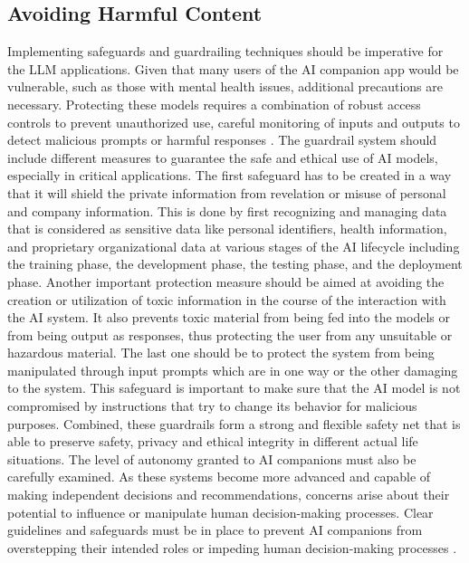 \subsection{Avoiding Harmful Content}
Implementing safeguards and guardrailing techniques \cite{biswas2023guardrails} should be imperative for the LLM applications. Given that many users of the AI companion app would be vulnerable, such as those with mental health issues, additional precautions are necessary. Protecting these models requires a combination of robust access controls to prevent unauthorized use, careful monitoring of inputs and outputs to detect malicious prompts or harmful responses \cite{ayyamperumal2024current}. The guardrail system should include different measures to guarantee the safe and ethical use of AI models, especially in critical applications. The first safeguard has to be created in a way that it will shield the private information from revelation or misuse of personal and company information. This is done by first recognizing and managing data that is considered as sensitive data like personal identifiers, health information, and proprietary organizational data at various stages of the AI lifecycle including the training phase, the development phase, the testing phase, and the deployment phase. Another important protection measure should be aimed at avoiding the creation or utilization of toxic information in the course of the interaction with the AI system. It also prevents toxic material from being fed into the models or from being output as responses, thus protecting the user from any unsuitable or hazardous material. The last one should be to protect the system from being manipulated through input prompts which are in one way or the other damaging to the system. This safeguard is important to make sure that the AI model is not compromised by instructions that try to change its behavior for malicious purposes. Combined, these guardrails form a strong and flexible safety net that is able to preserve safety, privacy and ethical integrity in different actual life situations. The level of autonomy granted to AI companions must also be carefully examined. As these systems become more advanced and capable of making independent decisions and recommendations, concerns arise about their potential to influence or manipulate human decision-making processes. Clear guidelines and safeguards must be in place to prevent AI companions from overstepping their intended roles or impeding human decision-making processes \cite{jiao2024navigating}.
